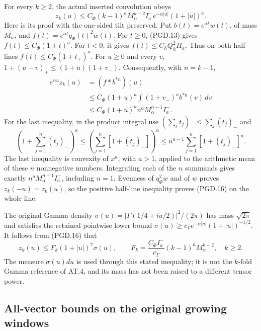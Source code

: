 For every \(k\geq2\), the actual inserted convolution obeys
\[
 \boxed{\quad
 z_k(u)\leq C_\Phi(k-1)^aM_\alpha^{k-2}I_a^-
               e^{-\alpha|u|}(1+|u|)^a.
 \quad}
 \tag{PGD.16}\label{eq:pgd-z-envelope}
\]
Here is its proof with the one-sided tilt preserved. Put
\(b(t)=e^{\alpha t}w(t)\), of mass \(M_\alpha\), and
\(f(t)=e^{\alpha t}q_\Phi(t)^2w(t)\).
For \(t\geq0\), (PGD.13) gives
\(f(t)\leq C_\Phi(1+t)^a\). For \(t<0\), it gives
\(f(t)\leq C_hQ_h^2H_a\). Thus on both half-lines
\(f(t)\leq C_\Phi(1+t_+)^a\).
For \(u\geq0\) and every \(v\),
\(1+(u-v)_+\leq(1+u)(1+v_-)\). Consequently, with \(n=k-1\),
\[
 \begin{split}
 e^{\alpha u}z_k(u)
 &=(f*b^{*n})(u)\\
 &\leq C_\Phi(1+u)^a
       \int(1+v_-)^ab^{*n}(v)\,dv\\
 &\leq C_\Phi(1+u)^a n^aM_\alpha^{n-1}I_a^- .
 \end{split}
 \tag{PGD.17}\label{eq:pgd-tilt-proof}
\]
For the last inequality, in the product integral use
\((\sum_j t_j)_-\leq\sum_j(t_j)_-\) and
\[
 (1+\sum_{j=1}^n(t_j)_-)^a
 \leq\left(\sum_{j=1}^n[1+(t_j)_-]\right)^a
 \leq n^{a-1}\sum_{j=1}^n[1+(t_j)_-]^a.
\]
The last inequality is convexity of \(x^a\), with \(a>1\),
applied to the arithmetic mean of these \(n\) nonnegative numbers.
Integrating each of the \(n\) summands gives exactly
\(n^aM_\alpha^{n-1}I_a^-\), including \(n=1\).
Evenness of \(q_\Phi^2w\) and of \(w\) proves \(z_k(-u)=z_k(u)\),
so the positive half-line inequality proves (PGD.16) on the whole line.

The original Gamma density
\(\sigma(u)=|\Gamma(1/4+iu/2)|^2/(2\pi)\) has mass
\(\sqrt{2\pi}\) and satisfies the retained pointwise lower bound
\(\sigma(u)\geq c_\Gamma e^{-\alpha|u|}(1+|u|)^{-1/2}\).
It follows from (PGD.16) that
\[
 z_k(u)\leq F_k(1+|u|)^7\sigma(u),\qquad
 F_k=\frac{C_\Phi I_a^-}{c_\Gamma}
                    (k-1)^aM_\alpha^{k-2},\quad k\geq2.
 \tag{PGD.18}\label{eq:pgd-z-Gamma}
\]
The measure \(\sigma(u)du\) is used through this stated inequality;
it is not the \(k\)-fold Gamma reference of AT.4, and its mass
has not been raised to a different tensor power.

\subsection{All-vector bounds on the original growing windows}

